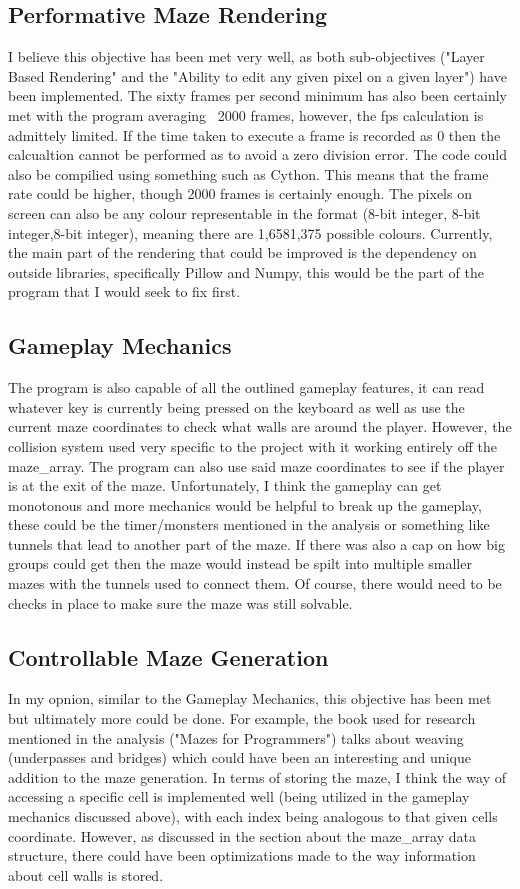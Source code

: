 \documentclass{article}
\begin{document}
\subsection{Performative Maze Rendering}
I believe this objective has been met very well, as both sub-objectives ("Layer Based Rendering" and the "Ability to edit any given pixel on a given layer") have been implemented. The sixty frames per second minimum has also been certainly met with the program averaging ~2000 frames, however, the  fps calculation is admittely limited. If the time taken to execute a frame is recorded as 0 then the calcualtion cannot be performed as to avoid a zero division error. The code could also be compilied using something such as Cython. This means that the frame rate could be higher, though 2000 frames is certainly enough. The pixels on screen can also be any colour representable in the format (8-bit integer, 8-bit integer,8-bit integer), meaning there are 1,6581,375 possible colours. Currently, the main part of the rendering that could be improved is the dependency on outside libraries, specifically Pillow and Numpy, this would be the part of the program that I would seek to fix first. 

\subsection{Gameplay Mechanics}
The program is also capable of all the outlined gameplay features, it can read whatever key is currently being pressed on the keyboard as well as use the current maze coordinates to check what walls are around the player. However, the collision system used very specific to the project with it working entirely off the maze\_array. The program can also use said maze coordinates to see if the player is at the exit of the maze. Unfortunately, I think the gameplay can get monotonous and more mechanics would be helpful to break up the gameplay, these could be the timer/monsters mentioned in the analysis or something like tunnels that lead to another part of the maze. If there was also a cap on how big groups could get then the maze would instead be spilt into multiple smaller mazes with the tunnels used to connect them. Of course, there would need to be checks in place to make sure the maze was still solvable.

\subsection{Controllable Maze Generation}
In my opnion, similar to the Gameplay Mechanics, this objective has been met but ultimately more could be done. For example, the book used for research mentioned in the analysis ("Mazes for Programmers") talks about weaving (underpasses and bridges) which could have been an interesting and unique addition to the maze generation. In terms of storing the maze, I think the way of accessing a specific cell is implemented well (being utilized in the gameplay mechanics discussed above), with each index being analogous to that given cells coordinate. However, as discussed in the section about the maze\_array data structure, there could have been optimizations made to the way information about cell walls is stored.
\end{document}
